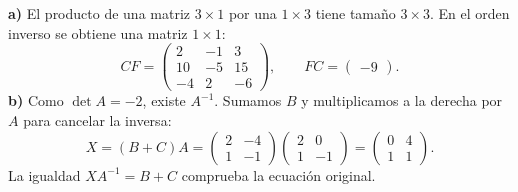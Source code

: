 \textbf{a)} El producto de una matriz $3\times1$ por una $1\times3$ tiene tamaño $3\times3$. En el orden inverso se obtiene una matriz $1\times1$:
\[
 CF=\boxed{\begin{pmatrix}2&-1&3\\10&-5&15\\-4&2&-6\end{pmatrix}},
 \qquad FC=\boxed{\begin{pmatrix}-9\end{pmatrix}}.
\]
\textbf{b)} Como $\det A=-2$, existe $A^{-1}$. Sumamos $B$ y multiplicamos a la derecha por $A$ para cancelar la inversa:
\[
 X=(B+C)A
 =\begin{pmatrix}2&-4\\1&-1\end{pmatrix}
  \begin{pmatrix}2&0\\1&-1\end{pmatrix}
 =\boxed{\begin{pmatrix}0&4\\1&1\end{pmatrix}}.
\]
La igualdad $XA^{-1}=B+C$ comprueba la ecuación original.
